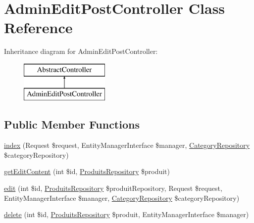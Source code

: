 \hypertarget{class_app_1_1_controller_1_1_admin_edit_post_controller}{}\section{Admin\+Edit\+Post\+Controller Class Reference}
\label{class_app_1_1_controller_1_1_admin_edit_post_controller}
Inheritance diagram for Admin\+Edit\+Post\+Controller\+:\begin{figure}[H]
\begin{center}
\leavevmode
\includegraphics[height=2.000000cm]{class_app_1_1_controller_1_1_admin_edit_post_controller}
\end{center}
\end{figure}
\subsection*{Public Member Functions}
\begin{DoxyCompactItemize}
\item 
\mbox{\hyperlink{class_app_1_1_controller_1_1_admin_edit_post_controller_a125dd362544d79e6056e4b57cb43135b}{index}} (Request \$request, Entity\+Manager\+Interface \$manager, \mbox{\hyperlink{class_app_1_1_repository_1_1_category_repository}{Category\+Repository}} \$category\+Repository)
\item 
\mbox{\hyperlink{class_app_1_1_controller_1_1_admin_edit_post_controller_ab65e87c7f80014f2b687f789eba6d3b4}{get\+Edit\+Content}} (int \$id, \mbox{\hyperlink{class_app_1_1_repository_1_1_produits_repository}{Produits\+Repository}} \$produit)
\item 
\mbox{\hyperlink{class_app_1_1_controller_1_1_admin_edit_post_controller_a0578b6f3be8a0c7857aa19c7e343db4c}{edit}} (int \$id, \mbox{\hyperlink{class_app_1_1_repository_1_1_produits_repository}{Produits\+Repository}} \$produit\+Repository, Request \$request, Entity\+Manager\+Interface \$manager, \mbox{\hyperlink{class_app_1_1_repository_1_1_category_repository}{Category\+Repository}} \$category\+Repository)
\item 
\mbox{\hyperlink{class_app_1_1_controller_1_1_admin_edit_post_controller_af982d7c8be1c44eb293d63ab7920592b}{delete}} (int \$id, \mbox{\hyperlink{class_app_1_1_repository_1_1_produits_repository}{Produits\+Repository}} \$produit, Entity\+Manager\+Interface \$manager)
\end{DoxyCompactItemize}



